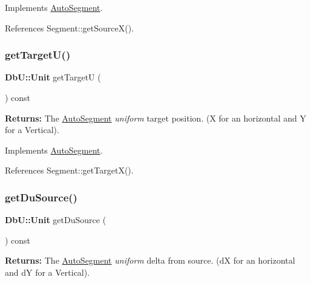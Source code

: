 Implements \hyperlink{classKatabatic_1_1AutoSegment_aeaa1543880686755e389c4807128428f}{Auto\+Segment}.



References Segment\+::get\+Source\+X().

\mbox{\label{classKatabatic_1_1AutoHorizontal_a4d52a506cd19dfa8e22e1dc0695bd960}} 
\subsubsection{\texorpdfstring{get\+Target\+U()}{getTargetU()}}
{\footnotesize\ttfamily \textbf{ Db\+U\+::\+Unit} get\+TargetU (\begin{DoxyParamCaption}{ }\end{DoxyParamCaption}) const\hspace{0.3cm}{\ttfamily [virtual]}}

{\bfseries Returns\+:} The \hyperlink{classKatabatic_1_1AutoSegment}{Auto\+Segment} {\itshape uniform} target position. (X for an horizontal and Y for a Vertical). 

Implements \hyperlink{classKatabatic_1_1AutoSegment_a828fef2716cc9c370d6d170bb96556ec}{Auto\+Segment}.



References Segment\+::get\+Target\+X().

\mbox{\label{classKatabatic_1_1AutoHorizontal_a760500b1fd027c71f5362dd8c0b01ea7}} 
\subsubsection{\texorpdfstring{get\+Du\+Source()}{getDuSource()}}
{\footnotesize\ttfamily \textbf{ Db\+U\+::\+Unit} get\+Du\+Source (\begin{DoxyParamCaption}{ }\end{DoxyParamCaption}) const\hspace{0.3cm}{\ttfamily [virtual]}}

{\bfseries Returns\+:} The \hyperlink{classKatabatic_1_1AutoSegment}{Auto\+Segment} {\itshape uniform} delta from source. (dX for an horizontal and dY for a Vertical). 

